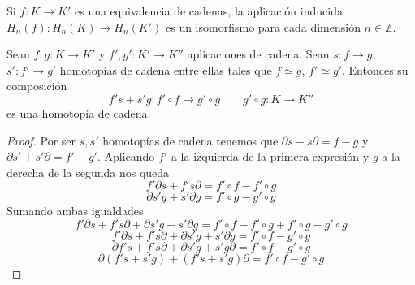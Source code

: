 \begin{corolario}
	Si $f: K \rightarrow K'$ es una equivalencia de cadenas, la aplicación inducida $H_n(f): H_n(K) \rightarrow H_n(K')$ es un isomorfismo para cada dimensión $n \in \mathbb{Z}$.
\end{corolario}

\begin{proposicion}
	Sean $f,g: K \rightarrow K'$ y $f',g': K' \rightarrow K''$ aplicaciones de cadena. Sean $s: f \rightarrow g$, $s': f' \rightarrow g'$ homotopías de cadena entre ellas tales que $f \simeq g$, $f' \simeq g'$. Entonces su composición
	\[ f' s + s' g: f' \circ f \rightarrow g' \circ g \qquad g' \circ g : K \rightarrow K'' \]
	es una homotopía de cadena.
\end{proposicion}
\begin{proof}
	Por ser $s,s'$ homotopías de cadena tenemos que $\partial s + s\partial = f-g$ y $\partial s' + s'\partial = f'-g'$. Aplicando  $f'$ a la izquierda de la primera expresión y $g$ a la derecha de la segunda nos queda
	\[ f'\partial s + f's\partial = f' \circ f-f' \circ g \]
	\[ \partial s' g + s'\partial g = f' \circ g-g' \circ g \]
	Sumando ambas igualdades
	\[ f'\partial s + f's\partial + \partial s' g + s'\partial g = f' \circ f-f' \circ g + f' \circ g-g' \circ g \]
	\[ f'\partial s + f's\partial + \partial s' g + s'\partial g = f' \circ f - g' \circ g \]
	\[ \partial f' s + f's \partial + \partial s' g + s' g \partial = f' \circ f - g' \circ g \]
	\[ \partial (f' s + s' g) + (f's + s' g) \partial = f' \circ f - g' \circ g \]
\end{proof}



\endinput
